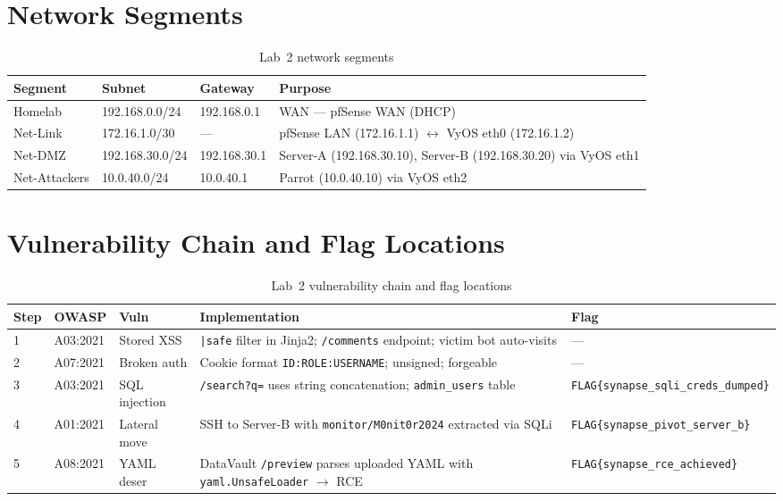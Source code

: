 \section*{Network Segments}

\begin{table}[H]
\centering
\begin{tabularx}{\textwidth}{lllX}
\toprule
\textbf{Segment} & \textbf{Subnet} & \textbf{Gateway} & \textbf{Purpose} \\
\midrule
Homelab        & 192.168.0.0/24  & 192.168.0.1  & WAN --- pfSense WAN (DHCP) \\
Net-Link       & 172.16.1.0/30   & ---           & pfSense LAN (172.16.1.1) $\leftrightarrow$ VyOS eth0 (172.16.1.2) \\
Net-DMZ        & 192.168.30.0/24 & 192.168.30.1  & Server-A (192.168.30.10), Server-B (192.168.30.20) via VyOS eth1 \\
Net-Attackers  & 10.0.40.0/24    & 10.0.40.1     & Parrot (10.0.40.10) via VyOS eth2 \\
\bottomrule
\end{tabularx}
\caption{Lab~2 network segments}
\label{tab:lab2-segments}
\end{table}

\section*{Vulnerability Chain and Flag Locations}

\begin{table}[H]
\centering
\small
\begin{tabularx}{\textwidth}{lllX>{\raggedright\arraybackslash\small}p{3.2cm}}
\toprule
\textbf{Step} & \textbf{OWASP} & \textbf{Vuln} & \textbf{Implementation} & \textbf{Flag} \\
\midrule
1 & A03:2021 & Stored XSS    & \texttt{|safe} filter in Jinja2; \texttt{/comments} endpoint; victim bot auto-visits & --- \\
2 & A07:2021 & Broken auth   & Cookie format \texttt{ID:ROLE:USERNAME}; unsigned; forgeable & --- \\
3 & A03:2021 & SQL injection & \texttt{/search?q=} uses string concatenation; \texttt{admin\_users} table & \texttt{FLAG\{synapse\_sqli\_creds\_dumped\}} \\
4 & A01:2021 & Lateral move  & SSH to Server-B with \texttt{monitor/M0nit0r2024} extracted via SQLi & \texttt{FLAG\{synapse\_pivot\_server\_b\}} \\
5 & A08:2021 & YAML deser & DataVault \texttt{/preview} parses uploaded YAML with \texttt{yaml.UnsafeLoader} $\rightarrow$ RCE & \texttt{FLAG\{synapse\_rce\_achieved\}} \\
\bottomrule
\end{tabularx}
\caption{Lab~2 vulnerability chain and flag locations}
\label{tab:lab2-vuln-chain}
\end{table}

